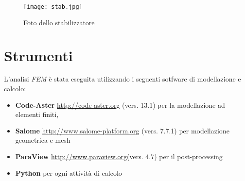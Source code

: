 \documentclass[
10pt, %
a4paper, %
oneside, %
headinclude,footinclude, %
BCOR5mm, %
]{scrartcl}
\begin{document}
\begin{figure}[tb]
	\centering 
	\texttt{[image: stab.jpg]} 
	\caption[foto stabilizzatore]{Foto dello stabilizzatore} %
	\label{fig:stab260} 
\end{figure}





\newpage %


\section{Strumenti}


L'analisi \emph{FEM} \`{e} stata eseguita utilizzando i seguenti sotfware di modellazione e calcolo:

\begin{itemize}
	\item \textbf{Code-Aster} \url{http://code-aster.org} (vers. 13.1) per la modellazione ad elementi finiti,
	\item \textbf{{Salome}} \url{http://www.salome-platform.org} (vers. 7.7.1) per modellazione geometrica e mesh
	\item \textbf{ParaView} \url{http://www.paraview.org}(vers. 4.7) per il post-processing
	\item \textbf{Python} per ogni attivit\`{a} di calcolo
\end{itemize}
\end{document}
